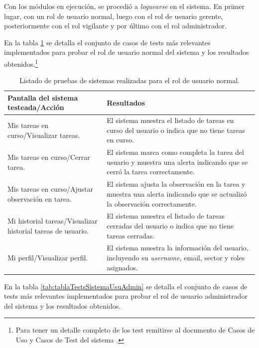 Con los módulos en ejecución, se procedió a \textit{loguearse} en el sistema. En primer lugar, con un rol de usuario normal, luego con el rol de usuario gerente, posteriormente con el rol vigilante y por último con el rol administrador.

En la tabla  \ref{tab:tablaTestsSistemaUsuNormal} se detalla el conjunto de casos de tests más relevantes implementados para probar el rol de usuario normal del sistema y los resultados obtenidos.\footnote{\label{notaReusadaCasosTest}Para tener un detalle completo de los test remitirse al documento de Casos de Uso y Casos de Test del sistema \citep{WEBSITE:CasosUsoYTest}.}

\begin{table}[h]
	\centering
	\caption[Tipos de pruebas sistema]{Listado de pruebas de sistemas realizadas para el rol de usuario normal.}
	\begin{tabular}{ p{4cm} p{8.5cm}} 	

		\toprule
		\textbf{Pantalla del sistema testeada/Acción} & 
		\textbf{Resultados} 
		\\
		\midrule
Mis tareas en curso/Visualizar tareas.  & El sistema muestra el listado de tareas en curso del usuario o indica que no tiene tareas en curso. \\
Mis tareas en curso/Cerrar tarea.  & El sistema marca como completa la tarea del usuario y  muestra una alerta indicando que se cerró la tarea correctamente.  \\
Mis tareas en curso/Ajustar observación en tarea.  & El sistema ajusta la observación en la tarea y muestra una alerta indicando que se actualizó la observación correctamente. \\
Mi historial tareas/Visualizar historial tareas de usuario. & El sistema muestra el listado de tareas cerradas del usuario o indica que no tiene tareas cerradas. \\
Mi perfil/Visualizar perfil. & El sistema muestra la información del usuario, incluyendo su \textit{username}, email, sector y roles asignados. \\

		\bottomrule
		\hline
	\end{tabular}
	\label{tab:tablaTestsSistemaUsuNormal}
\end{table}


En la tabla  \ref{tab:tablaTestsSistemaUsuAdmin} se detalla el conjunto de casos de tests más relevantes implementados para probar el rol de usuario administrador del sistema y los resultados obtenidos. 

